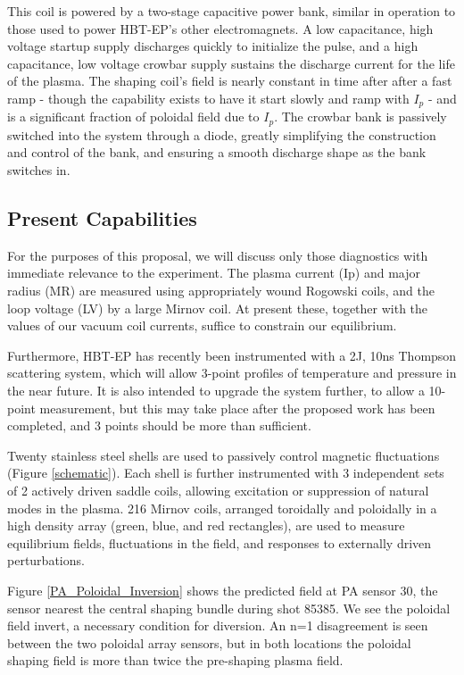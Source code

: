 \documentclass[aps,preprint,showpacs,superscriptaddress,groupedaddress]{revtex4}  %
\begin{document}
This coil is powered by a two-stage capacitive power bank, similar in operation to those used to power HBT-EP's other electromagnets\cite{Gates}. A low capacitance, high voltage startup supply discharges quickly to initialize the pulse, and a high capacitance, low voltage crowbar supply sustains the discharge current for the life of the plasma.  The shaping coil's field is nearly constant in time after after a fast ramp - though the capability exists to have it start slowly and ramp with $I_p$ - and is a significant fraction of poloidal field due to $I_p$.  The crowbar bank is passively switched into the system through a diode, greatly simplifying the construction and control of the bank, and ensuring a smooth discharge shape as the bank switches in.
\subsection{Present Capabilities}
	For the purposes of this proposal, we will discuss only those diagnostics with immediate relevance to the experiment.  The plasma current (Ip) and major radius (MR) are measured using appropriately wound Rogowski coils, and the loop voltage (LV) by a large Mirnov coil.  At present these, together with the values of our vacuum coil currents, suffice to constrain our equilibrium.\par
	Furthermore, HBT-EP has recently been instrumented with a 2J, 10ns Thompson scattering system, which will allow 3-point profiles of temperature and pressure in the near future.  It is also intended to upgrade the system further, to allow a 10-point measurement, but this may take place after the proposed work has been completed, and 3 points should be more than sufficient.\par
	Twenty stainless steel shells are used to passively control magnetic fluctuations (Figure \ref{schematic}).  Each shell is further instrumented with 3 independent sets of 2 actively driven saddle coils, allowing excitation or suppression of natural modes in the plasma.  216 Mirnov coils, arranged toroidally and poloidally in a high density array (green, blue, and red rectangles), are used to measure equilibrium fields, fluctuations in the field, and responses to externally driven perturbations.\par
	Figure \ref{PA_Poloidal_Inversion} shows the predicted field at PA sensor 30, the sensor nearest the central shaping bundle during shot 85385.  We see the poloidal field invert, a necessary condition for diversion.  An n=1 disagreement is seen between the two poloidal array sensors, but in both locations the poloidal shaping field is more than twice the pre-shaping plasma field.
	
\end{document}
